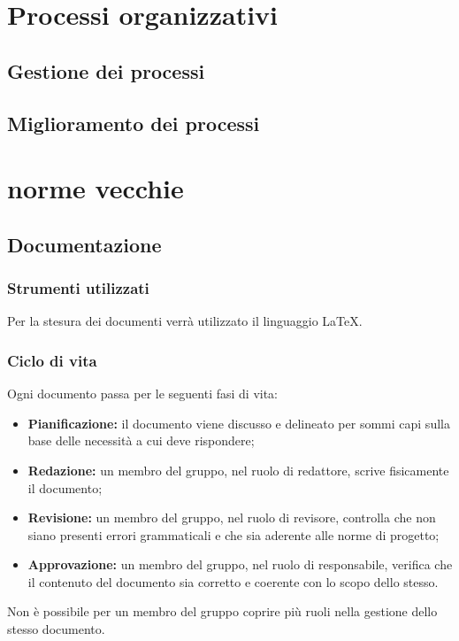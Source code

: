 \documentclass[a4paper, 12pt]{article}
\begin{document}
\section{Processi organizzativi}
\subsection{Gestione dei processi}
\subsection{Miglioramento dei processi}

\pagebreak
\section{norme vecchie}
\subsection{Documentazione}\label{documentazione}

\subsubsection{Strumenti utilizzati}
Per la stesura dei documenti verrà utilizzato il linguaggio \LaTeX.

\subsubsection{Ciclo di vita}
Ogni documento passa per le seguenti fasi di vita:
\begin{itemize}
\item \textbf{Pianificazione:} il documento viene discusso e delineato per sommi capi sulla base delle necessità a cui deve rispondere;
\item \textbf{Redazione:} un membro del gruppo, nel ruolo di redattore, scrive fisicamente il documento;
\item \textbf{Revisione:} un membro del gruppo, nel ruolo di revisore, controlla che non siano presenti errori grammaticali e che sia aderente alle norme di progetto;
\item \textbf{Approvazione:} un membro del gruppo, nel ruolo di responsabile, verifica che il contenuto del documento sia corretto e coerente con lo scopo dello stesso.
\end{itemize}

Non è possibile per un membro del gruppo coprire più ruoli nella gestione dello stesso documento.
\end{document}

